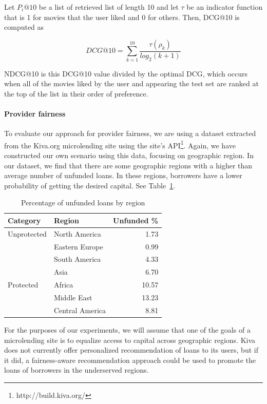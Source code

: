 Let $P_i@10$ be a list of retrieved list of length 10 and let $\tau$ be an indicator function that is 1 for movies that the user liked and 0 for others. Then, DCG@10 is computed as

\begin{equation}
DCG@10 = \sum_{k=1}^{10}{\frac{\tau(\rho_k)}{log_2(k+1)}}
\end{equation}

NDCG@10 is this DCG@10 value divided by the optimal DCG, which occurs when all of the movies liked by the user and appearing the test set are ranked at the top of the list in their order of preference.

\paragraph{\textbf{Provider fairness}}

To evaluate our approach for provider fairness, we are using a dataset extracted from the Kiva.org microlending site using the site's API\footnote{http://build.kiva.org/}. Again, we have constructed our own scenario using this data, focusing on geographic region. In our dataset, we find that there are some geographic regions with a higher than average number of unfunded loans. In these regions, borrowers have a lower probability of getting the desired capital. See Table~\ref{tab:unfunded}.

\begin{table}
    \centering
\begin{tabular}{l|l|r}
    Category & Region & Unfunded \% \\ \hline
    Unprotected & North America & 1.73 \\
    & Eastern Europe & 0.99 \\
    & South America & 4.33 \\
    & Asia & 6.70 \\ \hline
    Protected & Africa & 10.57 \\
    & Middle East & 13.23 \\
    & Central America & 8.81 \\
\end{tabular}
    \caption{Percentage of unfunded loans by region}
    \label{tab:unfunded}
\end{table}

For the purposes of our experiments, we will assume that one of the goals of a microlending site is to equalize access to capital across geographic regions. Kiva does not currently offer personalized recommendation of loans to its users, but if it did, a fairness-aware recommendation approach could be used to promote the loans of borrowers in the underserved regions. 

